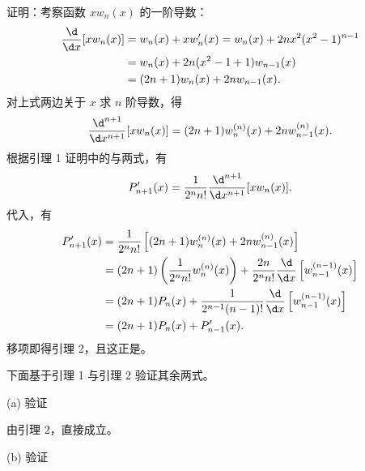 \begin{myproof}
    证明：考察函数 $x w_n(x)$ 的一阶导数：
    \begin{equation}\label{eq:lemma2-step1}
        \begin{aligned}
            \frac{\d}{\d x} [ x w_n(x) ] & = w_n(x) + x w_n'(x) = w_n(x) + 2n x^2 (x^2 - 1)^{n-1} \\
                                         & = w_n(x) + 2n(x^2 - 1 + 1) w_{n-1}(x)                  \\
                                         & = (2n+1) w_n(x) + 2n w_{n-1}(x).
        \end{aligned}
    \end{equation}
    对上式两边关于 $x$ 求 $n$ 阶导数，得
    \begin{equation}\label{eq:lemma2-step2}
        \frac{\d^{n+1}}{\d x^{n+1}} [ x w_n(x) ] = (2n+1) w_n^{(n)}(x) + 2n w_{n-1}^{(n)}(x).
    \end{equation}
    根据引理 1 证明中的与两式，有
    \begin{equation}\label{eq:lemma2-step3}
        P'_{n+1}(x) = \frac{1}{2^n n!} \frac{\d^{n+1}}{\d x^{n+1}} [ x w_n(x) ].
    \end{equation}
    代入，有
    \begin{equation}\label{eq:lemma2-step4}
        \begin{aligned}
            P'_{n+1}(x) & = \frac{1}{2^n n!} \left[ (2n+1) w_n^{(n)}(x) + 2n w_{n-1}^{(n)}(x) \right]                                                 \\
                        & = (2n+1) \left( \frac{1}{2^n n!} w_n^{(n)}(x) \right) + \frac{2n}{2^n n!} \frac{\d}{\d x} \left[ w_{n-1}^{(n-1)}(x) \right] \\
                        & = (2n+1) P_n(x) + \frac{1}{2^{n-1} (n-1)!} \frac{\d}{\d x} \left[ w_{n-1}^{(n-1)}(x) \right]                                \\
                        & = (2n+1) P_n(x) + P'_{n-1}(x).
        \end{aligned}
    \end{equation}
    移项即得引理 2，且这正是。

    下面基于引理 1 与引理 2 验证其余两式。

    (a) 验证

    由引理 2，直接成立。

    (b) 验证


\end{myproof}
